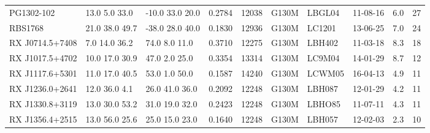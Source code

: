 \documentclass[twocolumn,tighten]{aastex6}
\begin{document}
\begin{table}[ht]
\begin{center}
\begin{tabular}{l l l l l l l l l l}
PG1302-102  		&    13.0  5.0  33.0  &    -10.0  33.0  20.0  &   0.2784  & 12038  		    &   G130M  &   LBGL04  		& 11-08-16  		   &  6.0   &      27         \\
RBS1768  		&  21.0  38.0  49.7  &    -38.0  28.0  40.0  &   0.1830  & 12936  		    &   G130M  &   LC1201 		& 13-06-25		   &  7.0   &      24         \\
RX J0714.5+7408  &     7.0  14.0  36.2  &      74.0  8.0  11.0   &   0.3710  & 12275  		    &   G130M  &   LBH402   		& 11-03-18   		   &  8.3   &      18         \\
RX J1017.5+4702  &   10.0  17.0  30.9  &      47.0  2.0  25.0   &   0.3354  & 13314  		    &   G130M  &   LC9M04		& 14-01-29		   &  8.7   &      12         \\
RX J1117.6+5301  &    11.0  17.0  40.5  &      53.0  1.0  50.0   &   0.1587  & 14240  		    &   G130M  &   LCWM05		& 16-04-13		   &  4.9   &      11         \\
RX J1236.0+2641  &     12.0  36.0  4.1  &    26.0  41.0  36.0   &   0.2092  & 12248  		    &   G130M  &   LBH087  		& 12-01-29  		   &  4.2   &      11         \\
RX J1330.8+3119  &   13.0  30.0  53.2  &    31.0  19.0  32.0   &   0.2423  & 12248  		    &   G130M  &   LBHO85  		& 11-07-11		   &   4.3  &      11         \\
RX J1356.4+2515  &   13.0  56.0  25.6  &    25.0  15.0  23.0   &   0.1640  & 12248  		    &   G130M  &   LBH057			& 12-02-03		   &   2.3  &      10         \\

\end{tabular}
\end{center}
\end{table}
\end{document}
